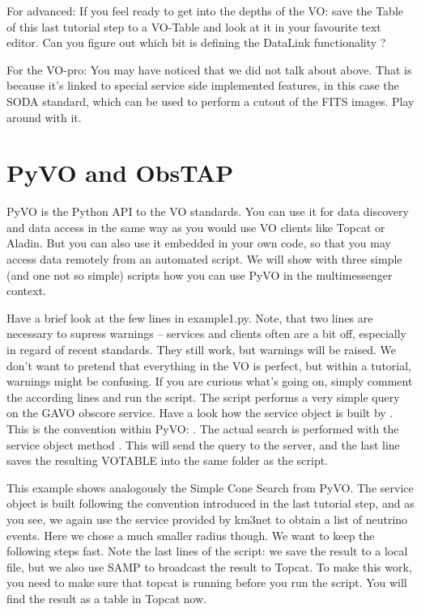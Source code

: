 \documentclass[twoside]{article}[12pt]
\begin{document}
\begin{exercise}
For advanced: If you feel ready to get into the depths of the VO: save the Table of
this last tutorial step to a VO-Table and look at it in your favourite
text editor. Can you figure out which bit is defining the DataLink
functionality ? 
\end{exercise}

\begin{exercise}
For the VO-pro: You may have noticed that we did not talk about
 above. That is because it's linked to special service
side implemented features, in this case the SODA standard, which can be
used to perform a cutout of the FITS images. Play around with it. 
\end{exercise}



\section{PyVO and ObsTAP}

PyVO is the Python API to the VO standards. You can use it for data
discovery and data access in the same way as you would use VO clients
like Topcat or Aladin. But you can also use it embedded in your own
code, so that you may access data remotely from an automated script. We
will show with three simple (and one not so simple) scripts how you can
use PyVO in the multimessenger context. 


Have a brief look at the few lines in example1.py. Note, that two lines
are necessary to supress warnings -- services and clients often are a
bit off, especially in regard of recent standards. They still work, but
warnings will be raised. We don't want to pretend that everything in the
VO is perfect, but within a tutorial, warnings might be confusing. If
you are curious what's going on, simply comment the according lines and
run the script.
The script performs a very simple query on the GAVO obscore service.
Have a look how the service object is built by
. This is the convention within PyVO:
. 
The actual search is performed with the service object method
. This will send the query to the server, and the last line
saves the resulting VOTABLE into the same folder as the script. 


This example shows analogously the Simple Cone Search from PyVO. The
service object is built following the convention introduced in the last
tutorial step, and as you see, we again use the service provided by
km3net to obtain a list of neutrino events. Here we chose a much smaller
radius though. We want to keep the following steps fast. Note the last
lines of the script: we save the result to a local file, but we also use
SAMP to broadcast the result to Topcat. To make this work, you need to
make sure that topcat is running before you run the script. You will
find the result as a table in Topcat now. 
\end{document}
